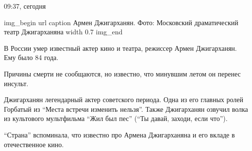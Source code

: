  
 
 

09:37, сегодня

\ifcmt
img_begin 
	url 
	caption Армен Джигарханян. Фото: Московский драматический театр Джигарханяна
	width 0.7
img_end
\fi

В России умер известный актер кино и театра, режиссер Армен Джигарханян.
Ему было 84 года. 

Причины смерти не сообщаются, но известно, что минувшим летом он перенес
инсульт. 

Джигарханян \dshM легендарный актер советского периода. Одна из его главных
ролей \dshM Горбатый из \enquote{Места встречи изменить нельзя}. Также Джигарханян
озвучил волка из культового мультфильма \enquote{Жил был пес} (\enquote{Ты давай, заходи,
если что}). 

\enquote{Страна} вспоминала, что известно про Армена Джигарханяна и его вкладе в
отечественное кино. 

